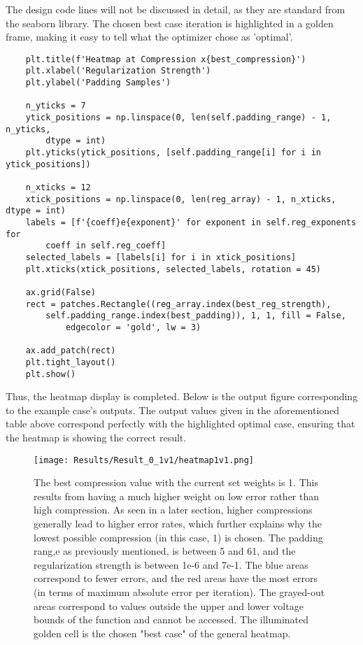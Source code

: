 \documentclass[11pt, a4paper]{article}
\theoremstyle{definition}
\numberwithin{equation}{section}
\begin{document}
The design code lines will not be discussed in detail, as they are standard from the seaborn library. The chosen best case iteration is highlighted in a golden frame, making it easy to tell what the optimizer chose as 'optimal'.

\begin{verbatim}
    plt.title(f'Heatmap at Compression x{best_compression}')
    plt.xlabel('Regularization Strength')
    plt.ylabel('Padding Samples')

    n_yticks = 7
    ytick_positions = np.linspace(0, len(self.padding_range) - 1, n_yticks, 
        dtype = int)
    plt.yticks(ytick_positions, [self.padding_range[i] for i in ytick_positions])
        
    n_xticks = 12
    xtick_positions = np.linspace(0, len(reg_array) - 1, n_xticks, dtype = int)
    labels = [f'{coeff}e{exponent}' for exponent in self.reg_exponents for 
        coeff in self.reg_coeff]
    selected_labels = [labels[i] for i in xtick_positions]
    plt.xticks(xtick_positions, selected_labels, rotation = 45)

    ax.grid(False)
    rect = patches.Rectangle((reg_array.index(best_reg_strength), 
        self.padding_range.index(best_padding)), 1, 1, fill = False, 
            edgecolor = 'gold', lw = 3)
    
    ax.add_patch(rect)
    plt.tight_layout()
    plt.show()
\end{verbatim}

Thus, the heatmap display is completed. Below is the output figure corresponding to the example case's outputs. The output values given in the aforementioned table above correspond perfectly with the highlighted optimal case, ensuring that the heatmap is showing the correct result.

\begin{figure}[h!]
    \centering
\texttt{[image: Results/Result\_0\_1v1/heatmap1v1.png]}
    \caption{The best compression value with the current set weights is 1. This results from having a much higher weight on low error rather than high compression. As seen in a later section, higher compressions generally lead to higher error rates, which further explains why the lowest possible compression (in this case, 1) is chosen. The padding rang,e as previously mentioned, is between 5 and 61, and the regularization strength is between 1e-6 and 7e-1. The blue areas correspond to fewer errors, and the red areas have the most errors (in terms of maximum absolute error per iteration). The grayed-out areas correspond to values outside the upper and lower voltage bounds of the function and cannot be accessed. The illuminated golden cell is the chosen "best case" of the general heatmap.}
\end{figure} \label{heatmap1.1}
\end{document}
